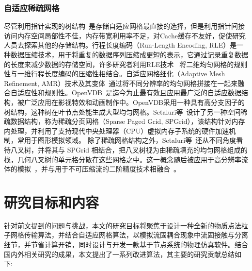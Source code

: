\subsubsection{自适应稀疏网格}
尽管利用指针实现的树结构~\cite{losasso2004simulating}是存储自适应网格最直接的选择，但是利用指针间接访问内存空间局部性不佳，内存带宽利用率不足，对Cache缓存不友好，促使研究人员去探索其他的存储结构。行程长度编码（Run-Length Encoding, RLE）是一种数据压缩技术，用于将重复的数据序列压缩成更短的表示，它通过记录重复数据的长度来减少数据的存储空间，许多研究者利用RLE技术~\cite{chentanez2011real, houston2006hierarchical} 将二维均匀网格的规则性与一维行程长度编码的压缩性相结合。自适应网格细化（Adaptive Mesh Refinement, AMR）技术及其变体~\cite{cohen2010interactive, english2013chimera}通过将不同分辨率的均匀网格拼接在一起来融合自适应性和规则性。OpenVDB~\cite{museth2013vdb}是迄今为止最有效且应用最广泛的自适应数据结构，被广泛应用在影视特效和动画制作中。OpenVDB采用一种具有高分支因子的树结构，这种树在叶节点处能生成大型均匀网格。Setaluri等~\cite{setaluri2014spgrid}设计了另一种空间稀疏数据结构，称为稀疏分页网格（Sparse Paged Grid, SPGrid），该结构针对内存内处理，并利用了支持现代中央处理器（CPU）虚拟内存子系统的硬件加速机制，常用于图形模拟领域。
除了稀疏网格结构之外，Setaluri等~\cite{setaluri2014spgrid}还从不同角度看待八叉树，并将其与 SPGrid 相结合，把八叉树视为由稀疏填充的均匀网格组成的栈，几何八叉树的单元格分散在这些网格之中。这一概念随后被应用于高分辨率流体的模拟~\cite{liu2016scalable}，并与用于不可压缩流的二阶精度技术相融合~\cite{aanjaneya2017power}。

\section{研究目标和内容}
针对前文提到的问题与挑战，本文的研究目标将聚焦于设计一种全新的物质点法粒子网格传输算法，并结合自适应网格算法，以模拟流固耦合现象中流固接触与分离细节，并节省计算开销，同时设计与开发一款基于节点系统的物理仿真软件。结合国内外相关研究的成果，本文提出了一系列改进算法，其主要的研究贡献总结如下:

